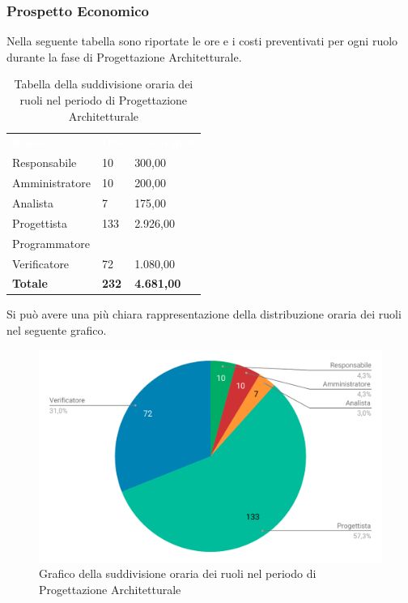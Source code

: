 \subsubsection{Prospetto Economico}
Nella seguente tabella sono riportate le ore e i costi preventivati per ogni ruolo durante la fase di Progettazione Architetturale.


\begin{table}[H]	
	\begin{center}
	    \begin{tabular}{C{4cm}C{1cm}C{3,5cm}}
			\textcolor{white}{\textbf{Ruolo}} & \textcolor{white}{\textbf{Ore}} & \textcolor{white}{\textbf{Costo in €}}
			\\
			Responsabile & 10 & 300,00 \\
			Amministratore & 10 & 200,00 \\
			Analista & 7 & 175,00 \\
			Progettista & 133 & 2.926,00 \\
			Programmatore &  & \space  \\
			Verificatore & 72 & 1.080,00 \\
			\textbf{Totale} & \textbf{232} & \textbf{4.681,00} \\
		\end{tabular}
	    \caption{Tabella della suddivisione oraria dei ruoli nel periodo di Progettazione Architetturale} \label{tab:tabellaRuoliProgettazione Architetturale} 
	\end{center}
\end{table}


Si può avere una più chiara rappresentazione della distribuzione oraria dei ruoli nel seguente grafico.

\begin{figure}[H]
	\includegraphics[width=1\linewidth]{Preventivo/grafici/PA2.pdf}
	\caption{Grafico della suddivisione oraria dei ruoli nel periodo di Progettazione Architetturale}
\end{figure}

